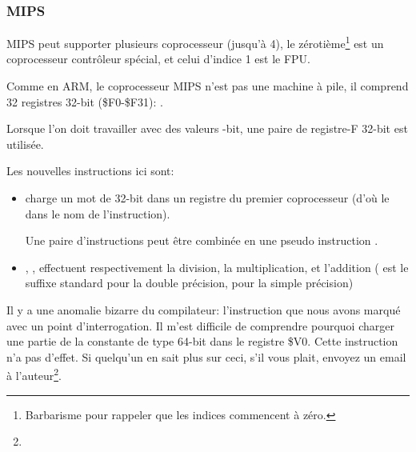 \subsubsection{MIPS}

MIPS peut supporter plusieurs coprocesseur (jusqu'à 4), le zérotième\footnote{Barbarisme pour rappeler que les indices commencent à zéro.} est un coprocesseur
contrôleur spécial, et celui d'indice 1 est le FPU.

Comme en ARM, le coprocesseur MIPS n'est pas une machine à pile, il comprend 32 registres
32-bit (\$F0-\$F31):
.

Lorsque l'on doit travailler avec des valeurs -bit, une paire de registre-F
32-bit est utilisée.



Les nouvelles instructions ici sont:

\begin{itemize}

\item {} charge un mot de 32-bit dans un registre du premier coprocesseur
(d'où le  dans le nom de l'instruction).

Une paire d'instructions  peut être combinée en une pseudo instruction .

\item {}, ,  effectuent respectivement la division,
la multiplication, et l'addition ( est le suffixe standard pour la double précision,
 pour la simple précision)

\end{itemize}

\myindex{\CompilerAnomaly}
\label{MIPS_FPU_LUI}

Il y a une anomalie bizarre du compilateur: l'instruction  que nous avons
marqué avec un point d'interrogation.
Il m'est difficile de comprendre pourquoi charger une partie de la constante de type
64-bit \Tdouble dans le registre \$V0. Cette instruction n'a pas d'effet.
Si quelqu'un en sait plus sur ceci, s'il vous plait, envoyez un email à l'auteur\footnote{\EMAIL}.

